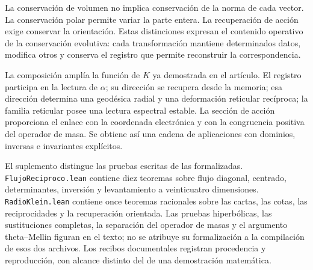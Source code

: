 La conservación de volumen no implica conservación de la norma de cada vector. La conservación polar permite variar la parte entera. La recuperación de acción exige conservar la orientación. Estas distinciones expresan el contenido operativo de la conservación evolutiva: cada transformación mantiene determinados datos, modifica otros y conserva el registro que permite reconstruir la correspondencia.

La composición amplía la función de \(K\) ya demostrada en el artículo. El registro participa en la lectura de \(\alpha\); su dirección se recupera desde la memoria; esa dirección determina una geodésica radial y una deformación reticular recíproca; la familia reticular posee una lectura espectral estable. La sección de acción proporciona el enlace con la coordenada electrónica y con la congruencia positiva del operador de masa. Se obtiene así una cadena de aplicaciones con dominios, inversas e invariantes explícitos.

El suplemento distingue las pruebas escritas de las formalizadas. \texttt{FlujoReciproco.lean} contiene diez teoremas sobre flujo diagonal, centrado, determinantes, inversión y levantamiento a veinticuatro dimensiones. \texttt{RadioKlein.lean} contiene once teoremas racionales sobre las cartas, las cotas, las reciprocidades y la recuperación orientada. Las pruebas hiperbólicas, las sustituciones completas, la separación del operador de masas y el argumento theta--Mellin figuran en el texto; no se atribuye su formalización a la compilación de esos dos archivos. Los recibos documentales registran procedencia y reproducción, con alcance distinto del de una demostración matemática.
